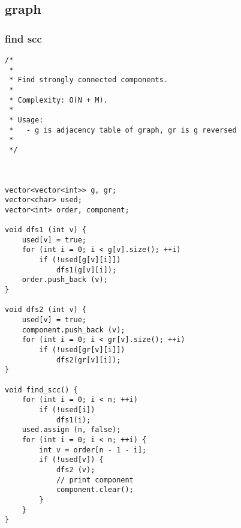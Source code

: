 \subsection{graph}
\subsubsection{find scc}
\begin{lstlisting}
/*
 *
 * Find strongly connected components.
 *
 * Complexity: O(N + M).
 *
 * Usage:
 *   - g is adjacency table of graph, gr is g reversed
 *
 */



vector<vector<int>> g, gr;
vector<char> used;
vector<int> order, component;
 
void dfs1 (int v) {
	used[v] = true;
	for (int i = 0; i < g[v].size(); ++i)
		if (!used[g[v][i]])
			dfs1(g[v][i]);
	order.push_back (v);
}
 
void dfs2 (int v) {
	used[v] = true;
	component.push_back (v);
	for (int i = 0; i < gr[v].size(); ++i)
		if (!used[gr[v][i]])
			dfs2(gr[v][i]);
}
 
void find_scc() {
	for (int i = 0; i < n; ++i)
		if (!used[i])
			dfs1(i);
	used.assign (n, false);
	for (int i = 0; i < n; ++i) {
		int v = order[n - 1 - i];
		if (!used[v]) {
			dfs2 (v);
            // print component
			component.clear();
		}
	}
}
\end{lstlisting}
